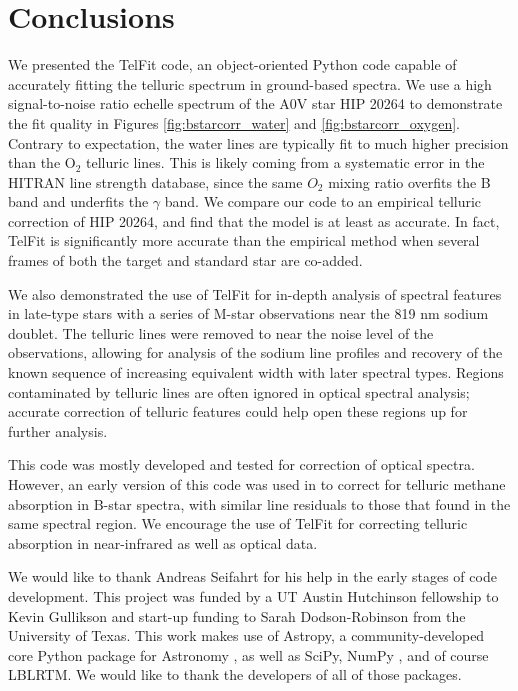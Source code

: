 \section{Conclusions}
\label{sec:conclusion}
We presented the TelFit code, an object-oriented Python code capable of accurately fitting the telluric spectrum in ground-based spectra. We use a high signal-to-noise ratio echelle spectrum of the A0V star HIP 20264 to demonstrate the fit quality in Figures \ref{fig:bstarcorr_water} and \ref{fig:bstarcorr_oxygen}. Contrary to expectation, the water lines are typically fit to much higher precision than the $\mathrm{O_2}$ telluric lines. This is likely coming from a systematic error in the HITRAN line strength database, since the same $O_2$ mixing ratio overfits the B band and underfits the $\gamma$ band. We compare our code to an empirical telluric correction of HIP 20264, and find that the model is at least as accurate. In fact, TelFit is significantly more accurate than the empirical method when several frames of both the target and standard star are co-added.

We also demonstrated the use of TelFit for in-depth analysis of spectral features in late-type stars with a series of M-star observations near the 819 nm sodium doublet. The telluric lines were removed to near the noise level of the observations, allowing for analysis of the sodium line profiles and recovery of the known sequence of increasing equivalent width with later spectral types. Regions contaminated by telluric lines are often ignored in optical spectral analysis; accurate correction of telluric features could help open these regions up for further analysis.

This code was mostly developed and tested for correction of optical spectra. However, an early version of this code was used in \cite{Gullikson2013} to correct for telluric methane absorption in B-star spectra, with similar line residuals to those that \cite{Seifahrt2011} found in the same spectral region. We encourage the use of TelFit for correcting telluric absorption in near-infrared as well as optical data.

We would like to thank Andreas Seifahrt for his help in the early stages of code development. This project was funded by a UT Austin Hutchinson fellowship to Kevin Gullikson and start-up funding to Sarah Dodson-Robinson from the University of Texas. This work makes use of Astropy, a community-developed core Python package for Astronomy \citep{Astropy}, as well as SciPy, NumPy \citep{Oliphant2007}, and of course LBLRTM. We would like to thank the developers of all of those packages.


